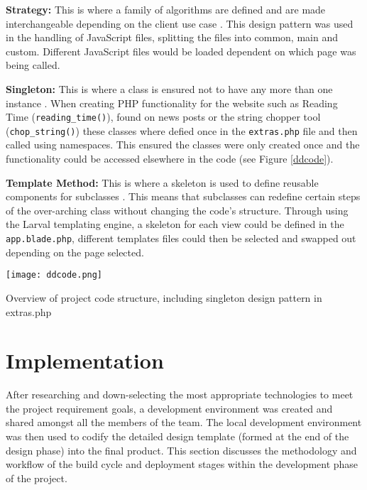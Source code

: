\documentclass[fontsize=11pt]{extarticle}
\numberwithin{figure}{section} %
\numberwithin{table}{section}%
\begin{document}
\textbf{Strategy:} This is where a family of algorithms are defined and
are made interchangeable depending on the client use case
\cite{gamma1995design}. This design pattern was used in the handling of
JavaScript files, splitting the files into common, main and custom.
Different JavaScript files would be loaded dependent on which page was
being called.

\textbf{Singleton:} This is where a class is ensured not to have any
more than one instance \cite{gamma1995design}. When creating PHP
functionality for the website such as Reading Time
(\texttt{reading\_time()}), found on news posts or the string chopper
tool (\texttt{chop\_string()}) these classes where defied once in the
\texttt{extras.php} file and then called using namespaces. This ensured
the classes were only created once and the functionality could be
accessed elsewhere in the code (see Figure \ref{ddcode}).

\textbf{Template Method:} This is where a skeleton is used to define
reusable components for subclasses \cite{gamma1995design}. This means
that subclasses can redefine certain steps of the over-arching class
without changing the code's structure. Through using the Larval
templating engine, a skeleton for each view could be defined in the
\texttt{app.blade.php}, different templates files could then be selected
and swapped out depending on the page selected.

\begin{table}[H]
\centering
\texttt{[image: ddcode.png]}
\caption{Overview of project code structure, including singleton design pattern in extras.php}
\label{ddcode}
\end{table}

\newpage

\hypertarget{implementation}{%
\section{Implementation}\label{implementation}}

After researching and down-selecting the most appropriate technologies
to meet the project requirement goals, a development environment was
created and shared amongst all the members of the team. The local
development environment was then used to codify the detailed design
template (formed at the end of the design phase) into the final product.
This section discusses the methodology and workflow of the build cycle
and deployment stages within the development phase of the project.
\end{document}

